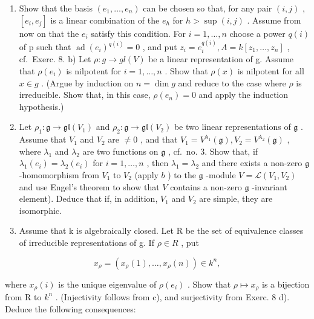 \begin{enumerate}
\def\labelenumi{\alph{enumi})}
\item
  Show that the basis \((e_{1},\ldots,e_{n})\) can be chosen so that, for any pair \((i,j)\) , \([e_{i},e_{j}]\) is a linear combination of the \(e_{h}\) for \(h > \sup(i,j)\) . Assume from now on that the \(e_{i}\) satisfy this condition. For \(i=1,\ldots,n\) choose a power \(q(i)\) of p such that \(\operatorname{ad}(e_{i})^{q(i)} = 0\) , and put \(z_{i} = e_{i}^{q(i)}, A = k[z_{1},\ldots,z_{n}]\) , cf.~Exerc. 8. b) Let \(\rho : g \to gl(V)\) be a linear representation of g. Assume that \(\rho(e_{i})\) is nilpotent for \(i = 1,\ldots,n\) . Show that \(\rho(x)\) is nilpotent for all \(x \in g\) . (Argue by induction on \(n = \dim g\) and reduce to the case where \(\rho\) is irreducible. Show that, in this case, \(\rho(e_{n}) = 0\) and apply the induction hypothesis.)
\item
  Let \(\rho_1: \mathfrak{g} \to \mathfrak{gl}(V_1)\) and \(\rho_2: \mathfrak{g} \to \mathfrak{gl}(V_2)\) be two linear representations of \(\mathfrak{g}\) . Assume that \(V_1\) and \(V_2\) are \(\neq 0\) , and that \(V_1 = V^{\lambda_1}(\mathfrak{g}), V_2 = V^{\lambda_2}(\mathfrak{g})\) , where \(\lambda_1\) and \(\lambda_2\) are two functions on \(\mathfrak{g}\) , cf.~no. 3. Show that, if \(\lambda_1(e_i) = \lambda_2(e_i)\) for \(i = 1, \ldots, n\) , then \(\lambda_1 = \lambda_2\) and there exists a non-zero \(\mathfrak{g}\) -homomorphism from \(V_1\) to \(V_2\) (apply \(b\) ) to the \(\mathfrak{g}\) -module \(V = \mathcal{L}(V_1, V_2)\) and use Engel's theorem to show that \(V\) contains a non-zero \(\mathfrak{g}\) -invariant element). Deduce that if, in addition, \(V_1\) and \(V_2\) are simple, they are isomorphic.
\item
  Assume that k is algebraically closed. Let R be the set of equivalence classes of irreducible representations of g. If \(\rho \in R\) , put
\end{enumerate}

\[
x _ {\rho} = (x _ {\rho} (1), \dots , x _ {\rho} (n)) \in k ^ {n},
\]

where \(x_{\rho}(i)\) is the unique eigenvalue of \(\rho(e_{i})\) . Show that \(\rho \mapsto x_{\rho}\) is a bijection from R to \(k^{n}\) . (Injectivity follows from c), and surjectivity from Exerc. 8 d). Deduce the following consequences:

